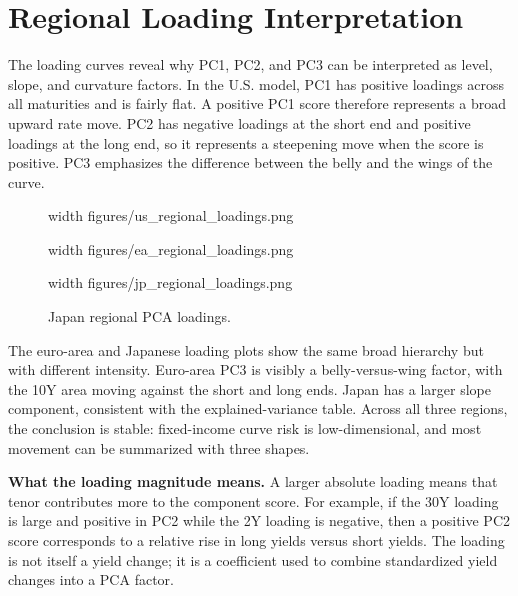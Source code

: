 \documentclass[11pt]{article}
\newcommand{\img}[2]{\pdfximage width #1 {#2}\pdfrefximage\pdflastximage}
\begin{document}
\clearpage

\section{Regional Loading Interpretation}

The loading curves reveal why PC1, PC2, and PC3 can be interpreted as level, slope, and curvature factors. In the U.S. model, PC1 has positive loadings across all maturities and is fairly flat. A positive PC1 score therefore represents a broad upward rate move. PC2 has negative loadings at the short end and positive loadings at the long end, so it represents a steepening move when the score is positive. PC3 emphasizes the difference between the belly and the wings of the curve.

\begin{figure}[htbp]
\centering
\begin{minipage}{0.32\linewidth}
\centering
\img{\linewidth}{figures/us_regional_loadings.png}
\caption{U.S. regional PCA loadings.}
\end{minipage}
\hfill
\begin{minipage}{0.32\linewidth}
\centering
\img{\linewidth}{figures/ea_regional_loadings.png}
\caption{Euro-area regional PCA loadings.}
\end{minipage}
\hfill
\begin{minipage}{0.32\linewidth}
\centering
\img{\linewidth}{figures/jp_regional_loadings.png}
\caption{Japan regional PCA loadings.}
\end{minipage}
\end{figure}

The euro-area and Japanese loading plots show the same broad hierarchy but with different intensity. Euro-area PC3 is visibly a belly-versus-wing factor, with the 10Y area moving against the short and long ends. Japan has a larger slope component, consistent with the explained-variance table. Across all three regions, the conclusion is stable: fixed-income curve risk is low-dimensional, and most movement can be summarized with three shapes.

\textbf{What the loading magnitude means.} A larger absolute loading means that tenor contributes more to the component score. For example, if the 30Y loading is large and positive in PC2 while the 2Y loading is negative, then a positive PC2 score corresponds to a relative rise in long yields versus short yields. The loading is not itself a yield change; it is a coefficient used to combine standardized yield changes into a PCA factor.
\end{document}
